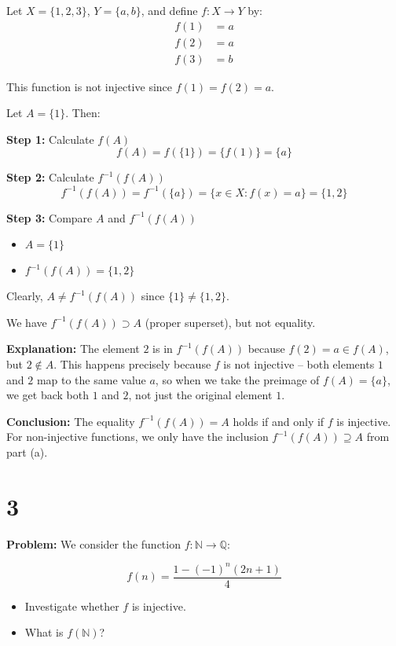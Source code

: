 \documentclass[12pt,a4paper]{article}
\theoremstyle{definition}
\theoremstyle{remark}
\begin{document}
Let $X = \{1, 2, 3\}$, $Y = \{a, b\}$, and define $f : X \to Y$ by:
\begin{align}
f(1) &= a\\
f(2) &= a\\
f(3) &= b
\end{align}

This function is not injective since $f(1) = f(2) = a$.

Let $A = \{1\}$. Then:

\textbf{Step 1:} Calculate $f(A)$
$$f(A) = f(\{1\}) = \{f(1)\} = \{a\}$$

\textbf{Step 2:} Calculate $f^{-1}(f(A))$
$$f^{-1}(f(A)) = f^{-1}(\{a\}) = \{x \in X : f(x) = a\} = \{1, 2\}$$

\textbf{Step 3:} Compare $A$ and $f^{-1}(f(A))$
\begin{itemize}
\item $A = \{1\}$
\item $f^{-1}(f(A)) = \{1, 2\}$
\end{itemize}

Clearly, $A \neq f^{-1}(f(A))$ since $\{1\} \neq \{1, 2\}$.

We have $f^{-1}(f(A)) \supset A$ (proper superset), but not equality.

\textbf{Explanation:} The element $2$ is in $f^{-1}(f(A))$ because $f(2) = a \in f(A)$, but $2 \notin A$. This happens precisely because $f$ is not injective -- both elements $1$ and $2$ map to the same value $a$, so when we take the preimage of $f(A) = \{a\}$, we get back both $1$ and $2$, not just the original element $1$.

\textbf{Conclusion:} The equality $f^{-1}(f(A)) = A$ holds if and only if $f$ is injective. For non-injective functions, we only have the inclusion $f^{-1}(f(A)) \supseteq A$ from part (a).


\section*{3}

\textbf{Problem:} We consider the function $f : \mathbb{N} \to \mathbb{Q}$:

$$f(n) = \frac{1 - (-1)^n(2n + 1)}{4}$$

\begin{itemize}
\item Investigate whether $f$ is injective.
\item What is $f(\mathbb{N})$?
\end{itemize}
\end{document}
